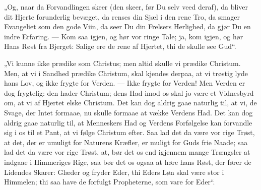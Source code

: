 \documentclass[12pt,a4paper]{book}
\begin{document}
„Og, naar da Forvandlingen skeer (den skeer, før Du selv veed deraf), da bliver dit Hjerte
forunderlig bevæget, da renses din Sjæl i den rene Tro, da smager Evangeliet som den gode
Viin, da seer Du din Frelsers Herlighed, da gjør Du en indre Erfaring. --- Kom saa igjen,
og hør vor ringe Tale; ja, kom
igjen, og hør Hans Røst fra Bjerget: {\large Salige ere de rene af Hjertet, thi de skulle
see Gud}“.

„Vi kunne ikke prædike som Christus; men altid skulle vi prædike Christum. Men, at vi i
Sandhed prædike Christum, skal kjendes derpaa, at vi trøstig lyde hans Lov, og ikke frygte
for Verden. --- Ikke frygte for Verden! Men Verden er dog frygtelig: den hader Christum;
dens Had imod os skal jo være et Vidnesbyrd om, at vi af Hjertet elske Christum. Det kan
dog aldrig gaae naturlig til, at vi, de Svage, der Intet formaae, nu skulle formaae at
vække Verdens Had. Det kan dog aldrig gaae naturlig til, at Menneskers Had og Verdens
Forfølgelse kan forvandle sig i os til et Pant, at vi følge Christum efter. Saa lad det da
være vor rige Trøst, at det, der er umuligt for Naturens Kræfler, er muligt for Guds frie
Naade; saa lad det da være vor rige Trøst, at, bør det os end igjennem mange Trængsler at
indgaae i Himmeriges Rige, saa bør det os ogsaa at høre hans Røst, der fører de Lidendes
Skarer: {\large Glæder og fryder Eder, thi Eders Løn skal være stor i Himmelen; thi saa
have de forfulgt Propheterne, som vare for Eder}“.
\end{document}
